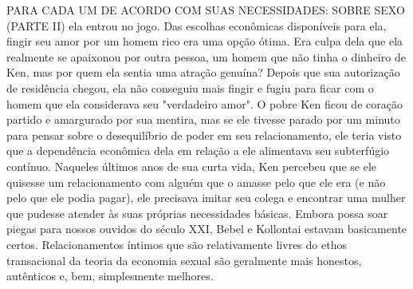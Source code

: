 PARA CADA UM DE ACORDO COM SUAS NECESSIDADES: SOBRE SEXO (PARTE II) ela entrou no jogo. Das escolhas econômicas disponíveis para ela, fingir seu amor por um homem rico era uma opção ótima. Era culpa dela que ela realmente se apaixonou por outra pessoa, um homem que não tinha o dinheiro de Ken, mas por quem ela sentia uma atração genuína? Depois que sua autorização de residência chegou, ela não conseguiu mais fingir e fugiu para ficar com o homem que ela considerava seu "verdadeiro amor". O pobre Ken ficou de coração partido e amargurado por sua mentira, mas se ele tivesse parado por um minuto para pensar sobre o desequilíbrio de poder em seu relacionamento, ele teria visto que a dependência econômica dela em relação a ele alimentava seu subterfúgio contínuo. Naqueles últimos anos de sua curta vida, Ken percebeu que se ele quisesse um relacionamento com alguém que o amasse pelo que ele era (e não pelo que ele podia pagar), ele precisava imitar seu colega e encontrar uma mulher que pudesse atender às suas próprias necessidades básicas. Embora possa soar piegas para nossos ouvidos do século XXI, Bebel e Kollontai estavam basicamente certos. Relacionamentos íntimos que são relativamente livres do ethos transacional da teoria da economia sexual são geralmente mais honestos, autênticos e, bem, simplesmente melhores.
 \par 
